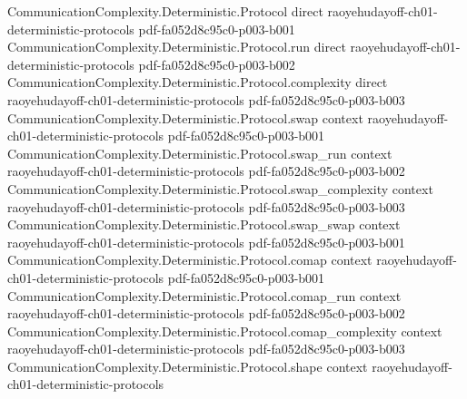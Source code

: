 \begin{theorem}
\label{CommunicationComplexity.Deterministic.Protocol.balanced_subprotocol}
\leanok
{}
\proofstep
  {CommunicationComplexity.Deterministic.Protocol}
  {direct}
  {raoyehudayoff-ch01-deterministic-protocols}
  {pdf-fa052d8c95c0-p003-b001}
\proofstep
  {CommunicationComplexity.Deterministic.Protocol.run}
  {direct}
  {raoyehudayoff-ch01-deterministic-protocols}
  {pdf-fa052d8c95c0-p003-b002}
\proofstep
  {CommunicationComplexity.Deterministic.Protocol.complexity}
  {direct}
  {raoyehudayoff-ch01-deterministic-protocols}
  {pdf-fa052d8c95c0-p003-b003}
\proofstep
  {CommunicationComplexity.Deterministic.Protocol.swap}
  {context}
  {raoyehudayoff-ch01-deterministic-protocols}
  {pdf-fa052d8c95c0-p003-b001}
\proofstep
  {CommunicationComplexity.Deterministic.Protocol.swap_run}
  {context}
  {raoyehudayoff-ch01-deterministic-protocols}
  {pdf-fa052d8c95c0-p003-b002}
\proofstep
  {CommunicationComplexity.Deterministic.Protocol.swap_complexity}
  {context}
  {raoyehudayoff-ch01-deterministic-protocols}
  {pdf-fa052d8c95c0-p003-b003}
\proofstep
  {CommunicationComplexity.Deterministic.Protocol.swap_swap}
  {context}
  {raoyehudayoff-ch01-deterministic-protocols}
  {pdf-fa052d8c95c0-p003-b001}
\proofstep
  {CommunicationComplexity.Deterministic.Protocol.comap}
  {context}
  {raoyehudayoff-ch01-deterministic-protocols}
  {pdf-fa052d8c95c0-p003-b001}
\proofstep
  {CommunicationComplexity.Deterministic.Protocol.comap_run}
  {context}
  {raoyehudayoff-ch01-deterministic-protocols}
  {pdf-fa052d8c95c0-p003-b002}
\proofstep
  {CommunicationComplexity.Deterministic.Protocol.comap_complexity}
  {context}
  {raoyehudayoff-ch01-deterministic-protocols}
  {pdf-fa052d8c95c0-p003-b003}
\proofstep
  {CommunicationComplexity.Deterministic.Protocol.shape}
  {context}
  {raoyehudayoff-ch01-deterministic-protocols}

\end{theorem}
